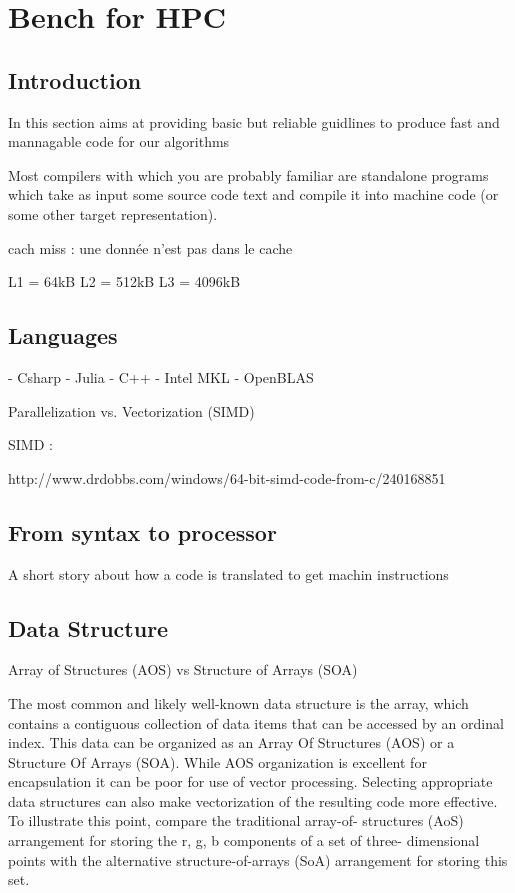 \chapter{Bench for HPC}

\section{Introduction}

In this section aims at providing basic but reliable guidlines to produce fast and mannagable code
for our algorithms

Most compilers with which you are probably familiar are standalone programs which take as input some source code text and compile it into machine code (or some other target representation).

cach miss : une donnée n'est pas dans le cache

\cite{Drepper2007}
\cite{Akanksha2012}

%
%

L1 = 64kB
L2 = 512kB
L3 = 4096kB

\section{Languages}
- Csharp
- Julia
- C++
- Intel MKL
- OpenBLAS

Parallelization vs. Vectorization (SIMD)

SIMD :

http://www.drdobbs.com/windows/64-bit-simd-code-from-c/240168851

\section{From syntax to processor}

A short story about how a code is translated to get machin instructions

\section{Data Structure}

Array of Structures (AOS) vs Structure of Arrays (SOA)

The most common and likely well-known data structure is the array, which contains a contiguous collection of data items that can be accessed by an ordinal index. This data can be organized as an Array Of Structures (AOS) or a Structure Of Arrays (SOA). While AOS organization is excellent for encapsulation it can be poor for use of vector processing. Selecting appropriate data structures can also make vectorization of the resulting code more effective. To illustrate this point, compare the traditional array-of- structures (AoS) arrangement for storing the r, g, b components of a set of three- dimensional points with the alternative structure-of-arrays (SoA) arrangement for storing this set.

